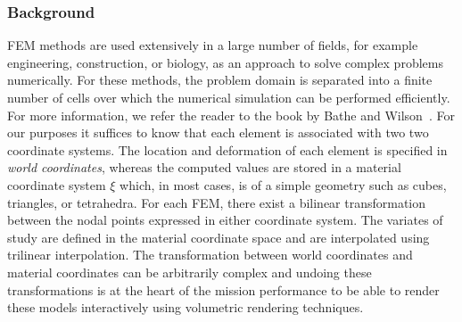 \subsubsection{Background}
\label{contributions:medbio:fem:background}
FEM methods are used extensively in a large number of fields, for example engineering, construction, or biology, as an approach to solve complex problems numerically. For these methods, the problem domain is separated into a finite number of cells over which the numerical simulation can be performed efficiently. For more information, we refer the reader to the book by Bathe and Wilson~\cite{bathe1976numerical}. For our purposes it suffices to know that each element is associated with two two coordinate systems. The location and deformation of each element is specified in \emph{world coordinates}, whereas the computed values are stored in a material coordinate system $\xi$ which, in most cases, is of a simple geometry such as cubes, triangles, or tetrahedra. For each FEM, there exist a bilinear transformation between the nodal points expressed in either coordinate system. The variates of study are defined in the material coordinate space and are interpolated using trilinear interpolation. The transformation between world coordinates and material coordinates can be arbitrarily complex and undoing these transformations is at the heart of the mission performance to be able to render these models interactively using volumetric rendering techniques.

